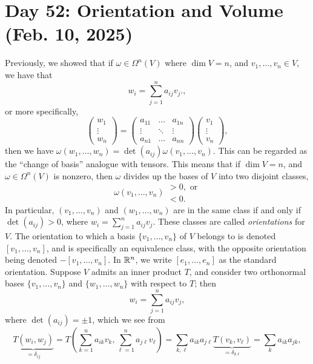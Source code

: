 \section{Day 52: Orientation and Volume (Feb. 10, 2025)}
Previously, we showed that if $\omega \in \Omega^n(V)$ where $\dim V = n$, and $v_1, \dots, v_n \in V$, we have that
\[ w_i = \sum_{j=1}^n a_{ij} v_j. \tag{$i = 1, \dots, n$}, \]
or more specifically,
\[ \begin{pmatrix} w_1 \\ \vdots \\ w_n \end{pmatrix} = \begin{pmatrix} a_{11} & \dots & a_{1n} \\ \vdots & \ddots & \vdots \\ a_{n1} & \dots & a_{nn} \end{pmatrix} \begin{pmatrix} v_1 \\ \vdots \\ v_n \end{pmatrix}, \]
then we have $\omega(w_1, \dots, w_n) = \det(a_{ij}) \omega(v_1, \dots, v_n)$. This can be regarded as the ``change of basis'' analogue with tensors. This means that if $\dim V = n$, and $\omega \in \Omega^n(V)$ is nonzero, then $\omega$ divides up the bases of $V$ into two disjoint classes,
\[ \omega(v_1, \dots, v_n) \begin{array}{ll} > 0, \text{ or} \\ < 0. \end{array} \]
In particular, $(v_1, \dots, v_n)$ and $(w_1, \dots, w_n)$ are in the same class if and only if $\det(a_{ij}) > 0$, where $w_i = \sum_{j=1}^n a_{ij} v_j$. These classes are called \textit{orientations} for $V$. The orientation to which a basis $\{v_1, \dots, v_n\}$ of $V$ belongs to is denoted $[v_1, \dots, v_n]$, and is specifically an equivalence class, with the opposite orientation being denoted $-[v_1, \dots, v_n]$. In $\mathbb R^n$, we write $[e_1, \dots, e_n]$ as the standard orientation.
\medskip\newline
Suppose $V$ admits an inner product $T$, and consider two orthonormal bases $\{v_1, \dots, v_n\}$ and $\{w_1, \dots, w_n\}$ with respect to $T$; then
\[ w_i = \sum_{j=1}^n a_{ij}v_j, \]
where $\det (a_{ij}) = \pm 1$, which we see from
\[ \underbrace{T(w_i, w_j)}_{= \delta_{ij}} = T\left(\sum_{k=1}^n a_{ik}v_k, \sum_{\ell=1}^n a_{j\ell} v_\ell\right) = \sum_{k, \ell} a_{ik} a_{j\ell} \underbrace{T(v_k, v_\ell)}_{= \delta_{k\ell}} = \sum_k a_{ik}a_{jk}, \]
